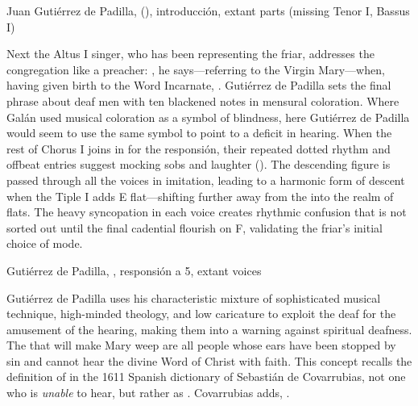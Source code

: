 
{Juan Gutiérrez de Padilla, 
(), introducción, extant parts (missing Tenor I, Bassus
I)}

Next the Altus I singer, who has been representing the friar, addresses the
congregation like a preacher: , he says---referring to the Virgin Mary---when, having given birth to the
Word Incarnate, .  
Gutiérrez de Padilla sets the final phrase about deaf men with ten blackened
notes in mensural coloration.
Where Galán used musical coloration as a symbol of blindness, here Gutiérrez de
Padilla would seem to use the same symbol to point to a deficit in hearing.
When the rest of Chorus I joins in for the responsión, their repeated dotted
rhythm and offbeat entries suggest mocking sobs and laughter 
().
The descending figure is passed through all the voices in imitation, leading to
a harmonic form of descent when the Tiple I adds E flat---shifting further away
from the  into the  realm of flats.
The heavy syncopation in each voice creates rhythmic confusion that is not
sorted out until the final cadential flourish on F, validating the friar's
initial choice of mode.

{Gutiérrez de Padilla, , responsión a 5,
extant voices}

Gutiérrez de Padilla uses his characteristic mixture of sophisticated musical
technique, high-minded theology, and low caricature to exploit the deaf for the
amusement of the hearing, making them into a warning against spiritual deafness.
The  that will make Mary weep are all people whose ears have
been stopped by sin and cannot hear the divine Word of Christ with faith.
This concept recalls the definition of  in the 1611 Spanish
dictionary of Sebastián de Covarrubias, not one who is \emph{unable} to hear,
but rather as .
Covarrubias adds, .%
    \Autocite
    [: .] 
    {Covarrubias:Tesoro}


